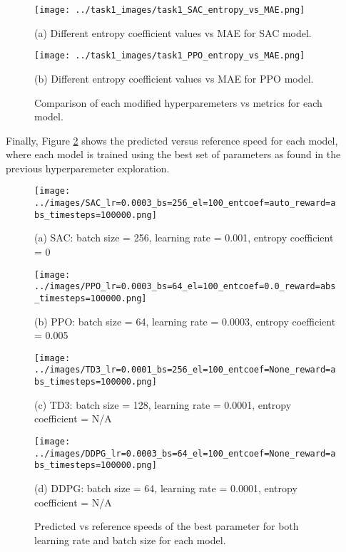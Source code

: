 \documentclass[11pt]{article}
\begin{document}
\begin{figure}[h!]
  \centering
  \begin{minipage}[b]{0.49\textwidth}
    \texttt{[image: ../task1\_images/task1\_SAC\_entropy\_vs\_MAE.png]}
    \caption*{(a) Different entropy coefficient values vs MAE for SAC model.}
  \end{minipage}
  \hfill
  \begin{minipage}[b]{0.49\textwidth}
    \texttt{[image: ../task1\_images/task1\_PPO\_entropy\_vs\_MAE.png]}
    \caption*{(b) Different entropy coefficient values vs MAE for PPO model.}
  \end{minipage}
  \caption{Comparison of each modified hyperparemeters vs metrics for each model.}
  \label{fig:ent_coef_vs_mae}
\end{figure}

Finally, Figure \ref{fig:pred_vs_ref} shows the predicted versus reference speed for each model, where each model is trained using the best set of parameters as found in the previous hyperparemeter exploration.

\begin{figure}[h!]
  \centering
  \begin{minipage}[b]{0.49\textwidth}
    \texttt{[image: ../images/SAC\_lr=0.0003\_bs=256\_el=100\_entcoef=auto\_reward=abs\_timesteps=100000.png]}
    \caption*{(a) SAC: batch size = 256, learning rate = 0.001, entropy coefficient = 0}
  \end{minipage}
  \hfill
  \begin{minipage}[b]{0.49\textwidth}
    \texttt{[image: ../images/PPO\_lr=0.0003\_bs=64\_el=100\_entcoef=0.0\_reward=abs\_timesteps=100000.png]}
    \caption*{(b) PPO: batch size = 64, learning rate = 0.0003, entropy coefficient = 0.005}
  \end{minipage}
  \begin{minipage}[b]{0.49\textwidth}
    \texttt{[image: ../images/TD3\_lr=0.0001\_bs=256\_el=100\_entcoef=None\_reward=abs\_timesteps=100000.png]}
    \caption*{(c) TD3: batch size = 128, learning rate = 0.0001, entropy coefficient = N/A}
  \end{minipage}
  \hfill
  \begin{minipage}[b]{0.49\textwidth}
    \texttt{[image: ../images/DDPG\_lr=0.0003\_bs=64\_el=100\_entcoef=None\_reward=abs\_timesteps=100000.png]}
    \caption*{(d) DDPG: batch size = 64, learning rate = 0.0001, entropy coefficient = N/A}
  \end{minipage}
  \caption{Predicted vs reference speeds of the best parameter for both learning rate and batch size for each model.}
  \label{fig:pred_vs_ref}
\end{figure}
\end{document}
